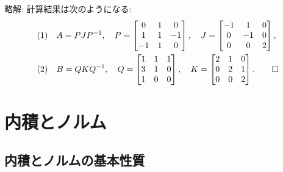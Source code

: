 \documentclass[12pt,twoside]{jarticle}
\newcommand\commentout[1]{#1}
\newcommand\commentout[1]{}
\begin{document}
\commentout{
\medskip\noindent
略解: 計算結果は次のようになる:
\begin{align*}
  &
  \text{(1)} \quad
  A = PJP^{-1},
  \quad
  P =
  \begin{bmatrix}
     0 &  1 &  0 \\
     1 &  1 & -1 \\
    -1 &  1 &  0 \\
  \end{bmatrix},
  \quad
  J = 
  \begin{bmatrix}
    -1 &  1 &  0 \\
     0 & -1 &  0 \\
     0 &  0 &  2 \\
  \end{bmatrix},
  \\ &
  \text{(2)} \quad
  B = QKQ^{-1},
  \quad
  Q =
  \begin{bmatrix}
    1 & 1 & 1 \\
    3 & 1 & 0 \\
    1 & 0 & 0 \\
  \end{bmatrix},
  \quad
  K = 
  \begin{bmatrix}
    2 & 1 & 0 \\
    0 & 2 & 1 \\
    0 & 0 & 2 \\
  \end{bmatrix}.
  \qed
\end{align*}
}


\section{内積とノルム}


\subsection{内積とノルムの基本性質}
\end{document}
